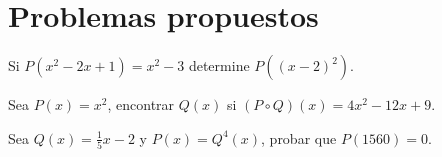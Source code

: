 \section{Problemas propuestos}

\begin{section-problem}
    Si $P(x^2 - 2x + 1) = x^2 - 3$ determine $P((x - 2)^2).$
\end{section-problem}

\begin{section-problem}
    Sea $P(x) = x^2$, encontrar $Q(x)$ si $(P \circ Q)(x) = 4x^2 - 12x + 9$.
\end{section-problem}

\begin{section-problem}
    Sea $Q(x) = \frac{1}{5} x - 2$ y $P(x) = Q^4(x)$, probar que $P(1560) = 0$.
\end{section-problem}


